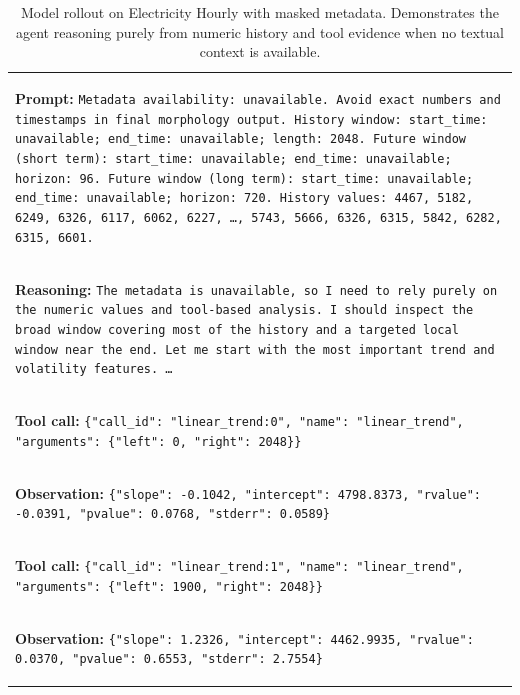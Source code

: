 \documentclass[11pt]{article}
\begin{document}
\begin{table}[t]
\caption{Model rollout on Electricity Hourly with masked metadata. Demonstrates the agent reasoning purely from numeric history and tool evidence when no textual context is available.}
\label{tab:tstar_masked_success_case}
\centering
\small
\begin{tabular}{p{}}
\toprule
\colorbox{gray!10}{\parbox{0.95\textwidth}{%
\textbf{Prompt:}
\texttt{Metadata availability: unavailable. Avoid exact numbers and timestamps
in final morphology output. History window: start\_time: unavailable;
end\_time: unavailable; length: 2048. Future window (short term):
start\_time: unavailable; end\_time: unavailable; horizon: 96. Future window
(long term): start\_time: unavailable; end\_time: unavailable; horizon: 720.
History values: 4467, 5182, 6249, 6326, 6117, 6062, 6227, \ldots, 5743,
5666, 6326, 6315, 5842, 6282, 6315, 6601.}
}} \\

\hdashline

\colorbox{green!10}{\parbox{0.95\textwidth}{%
\textbf{Reasoning:}
\texttt{The metadata is unavailable, so I need to rely purely on the numeric
values and tool-based analysis. I should inspect the broad window covering most
of the history and a targeted local window near the end. Let me start with the
most important trend and volatility features. \ldots}
}} \\

\hdashline

\colorbox{red!10}{\parbox{0.95\textwidth}{%
\textbf{Tool call:}
\texttt{\{"call\_id": "linear\_trend:0", "name": "linear\_trend",
"arguments": \{"left": 0, "right": 2048\}\}}
}} \\

\colorbox{blue!10}{\parbox{0.95\textwidth}{%
\textbf{Observation:}
\texttt{\{"slope": -0.1042, "intercept": 4798.8373, "rvalue": -0.0391,
"pvalue": 0.0768, "stderr": 0.0589\}}
}} \\

\hdashline

\colorbox{red!10}{\parbox{0.95\textwidth}{%
\textbf{Tool call:}
\texttt{\{"call\_id": "linear\_trend:1", "name": "linear\_trend",
"arguments": \{"left": 1900, "right": 2048\}\}}
}} \\

\colorbox{blue!10}{\parbox{0.95\textwidth}{%
\textbf{Observation:}
\texttt{\{"slope": 1.2326, "intercept": 4462.9935, "rvalue": 0.0370,
"pvalue": 0.6553, "stderr": 2.7554\}}
}} \\


\end{tabular}
\end{table}
\end{document}
